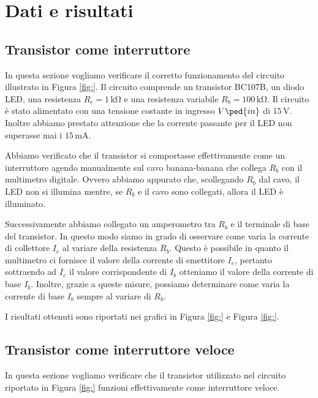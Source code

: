 \section*{Dati e risultati}

\subsection{Transistor come interruttore}

In questa sezione vogliamo verificare il corretto funzionamento del circuito illustrato in Figura \ref{fig:}.
Il circuito comprende un transistor BC107B, un diodo LED, una resistenza $R_c=1\,\si{\kilo\ohm}$ e una resistenza variabile $R_b=100\,\si{\kilo\ohm}$. Il circuito è stato alimentato con una tensione costante in ingresso $V\ped{in}$ di $15\,\si{\volt}$. Inoltre abbiamo prestato attenzione che la corrente passante per il LED non superasse mai i $15\,\si{\milli\ampere}$.

Abbiamo verificato che il transistor si comportasse effettivamente come un interruttore agendo manualmente sul cavo banana-banana che collega $R_b$ con il multimetro digitale. Ovvero abbiamo appurato che, scollegando $R_b$ dal cavo, il LED non si illumina mentre, se $R_b$ e il cavo sono collegati, allora il LED è illuminato.

Successivamente abbiamo collegato un amperometro tra $R_b$ e il terminale di base del transistor. In questo modo siamo in grado di osservare come varia la corrente di collettore $I_c$ al variare della resistenza $R_b$. Questo è possibile in quanto il multimetro ci fornisce il valore della corrente di emettitore $I_e$, pertanto sottraendo ad $I_e$ il valore corrispondente di $I_b$ otteniamo il valore della corrente di base $I_b$. Inoltre, grazie a queste misure, possiamo determinare come varia la corrente di base $I_b$ sempre al variare di $R_b$.

I risultati ottenuti sono riportati nei grafici in Figura \ref{fig:} e Figura \ref{fig:}.

\subsection{Transistor come interruttore veloce}

In questa sezione vogliamo verificare che il transistor utilizzato nel circuito riportato in Figura \ref{fig:} funzioni effettivamente come interruttore veloce.

\subsection{}

\subsection{}

\subsection{}
